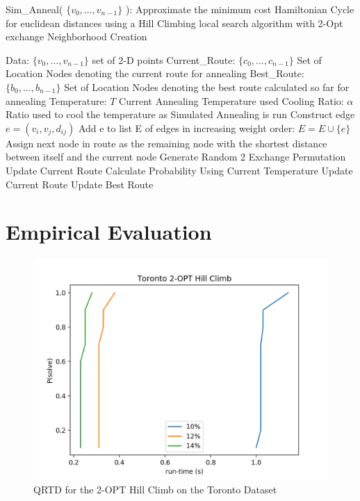 \documentclass[format=sigconf]{acmart}
\begin{document}
\begin{algorithm}[H] 
	\caption{  Sim\_Anneal( $\{v_0, \hdots, v_{n-1}\}$ ): Approximate the minimum cost Hamiltonian Cycle for euclidean distances using a Hill Climbing local search algorithm with 2-Opt exchange Neighborhood Creation}
	\begin{algorithmic} 
		\STATE Data: $\{v_0, \hdots, v_{n-1}\}$ set of 2-D points
		\STATE Current\_Route: $\{c_0, \hdots, c_{n-1}\}$ Set of Location Nodes denoting the current route for annealing
		\STATE Best\_Route: $\{b_0, \hdots, b_{n-1}\}$ Set of Location Nodes denoting the best route calculated so far for annealing
		\STATE Temperature: $T$ Current Annealing Temperature used
		\STATE Cooling Ratio: $\alpha$ Ratio used to cool the temperature as Simulated Annealing is run
			\STATE Construct edge $e = (v_i, v_j, d_{ij})$
			\STATE Add e to list E of edges in increasing weight order: $E = E \cup \{e\}$
		\ENDFOR
			\STATE Assign next node in route as the remaining node with the shortest distance between itself and the current node
		\ENDWHILE
			\STATE Generate Random 2 Exchange Permutation
				\STATE Update Current Route
			\ELSE
				\STATE Calculate Probability Using Current Temperature
					\STATE Update Current Route
				\ENDIF
			\ENDIF
				\STATE Update Best Route
			\ENDIF
		\ENDWHILE
	\end{algorithmic}
\end{algorithm}
\section*{Empirical Evaluation}
 
 
 
 

\begin{figure}[htbp]
    \centerline{\includegraphics[scale=.5]{graphs/Toronto_LS1_QRTD.png}}
    \caption{QRTD for the 2-OPT Hill Climb on the Toronto Dataset}
    \label{fig1}
\end{figure}
\end{document}
